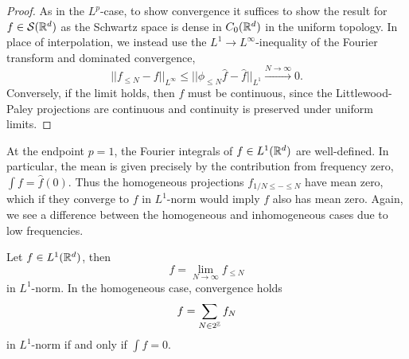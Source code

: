 \begin{proof}
	As in the $L^p$-case, to show convergence it suffices to show the result for $f \in \mathcal S (\mathbb R^d)$ as the Schwartz space is dense in $C_0 (\mathbb R^d)$ in the uniform topology. In place of interpolation, we instead use the $L^1 \to L^\infty$-inequality of the Fourier transform and dominated convergence,
		\[ || f_{\leq N} - f||_{L^\infty} \leq || \phi_{\leq N} \widehat f - \widehat f||_{L^1} \overset{N \to \infty}{\longrightarrow} 0. \]
	Conversely, if the limit holds, then $f$ must be continuous, since the Littlewood-Paley projections are continuous and continuity is preserved under uniform limits. 	
\end{proof}

At the endpoint $p = 1$, the Fourier integrals of $f \in L^1 (\mathbb R^d)$ are well-defined. In particular, the mean is given precisely by the contribution from frequency zero, $\int f = \widehat f (0)$. Thus the homogeneous projections $f_{1/N \leq - \leq N}$ have mean zero, which if they converge to $f$ in $L^1$-norm would imply $f$ also has mean zero.  Again, we see a difference between the homogeneous and inhomogeneous cases due to low frequencies. 

\begin{proposition}[$L^1$-convergence]
	Let $f \in L^1 (\mathbb R^d)$, then 
		\[ f = \lim_{N \to \infty} f_{\leq N} \]
	in $L^1$-norm. In the homogeneous case, convergence holds
		\[ f = \sum_{N \in 2^\mathbb Z} f_N \]
	in $L^1$-norm if and only if $\int f = 0$. 
\end{proposition}

